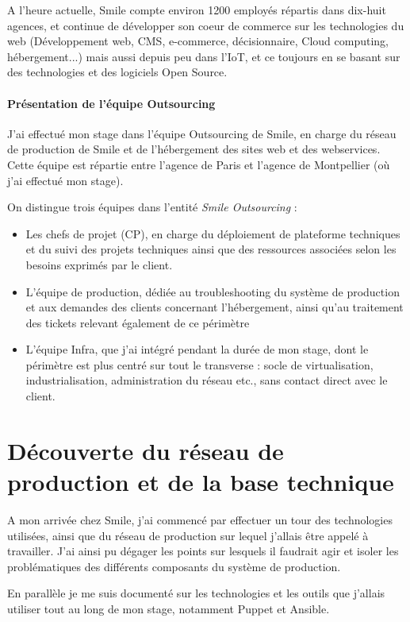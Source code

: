 \documentclass[14 pt,a4paper]{extreport}
\begin{document}
A l'heure actuelle, Smile compte environ 1200 employés répartis dans dix-huit agences, et continue de développer son coeur de commerce sur les technologies du web (Développement web, CMS, e-commerce, décisionnaire, Cloud computing, hébergement...) mais aussi depuis peu dans l'IoT, et ce toujours en se basant sur des technologies et des logiciels Open Source.

\subsubsection{Présentation de l'équipe Outsourcing}

J'ai effectué mon stage dans l'équipe Outsourcing de Smile, en charge du réseau de production de Smile et de l'hébergement des sites web et des webservices. Cette équipe est répartie entre l'agence de Paris et l'agence de Montpellier (où j'ai effectué mon stage).

On distingue trois équipes dans l'entité \emph{Smile Outsourcing} :
\begin{itemize}
	\item Les chefs de projet (CP), en charge du déploiement de plateforme techniques et du suivi des projets techniques ainsi que des ressources associées selon les besoins exprimés par le client.
	\item L'équipe de production, dédiée au troubleshooting du système de production et aux demandes des clients concernant l'hébergement, ainsi qu'au traitement des tickets relevant également de ce périmètre
	\item L'équipe Infra, que j'ai intégré pendant la durée de mon stage, dont le périmètre est plus centré sur tout le transverse : socle de virtualisation, industrialisation, administration du réseau etc., sans contact direct avec le client.
\end{itemize}

\chapter{Découverte du réseau de production et de la base technique}

A mon arrivée chez Smile, j'ai commencé par effectuer un tour des technologies utilisées, ainsi que du réseau de production sur lequel j'allais être appelé à travailler. J'ai ainsi pu dégager les points sur lesquels il faudrait agir et isoler les problématiques des différents composants du système de production.

En parallèle je me suis documenté sur les technologies et les outils que j'allais utiliser tout au long de mon stage, notamment Puppet et Ansible.
\end{document}
